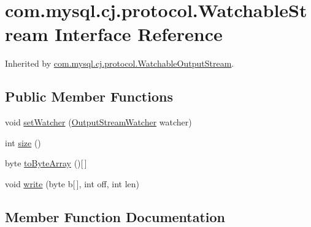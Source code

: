 \hypertarget{interfacecom_1_1mysql_1_1cj_1_1protocol_1_1_watchable_stream}{}\section{com.\+mysql.\+cj.\+protocol.\+Watchable\+Stream Interface Reference}
\label{interfacecom_1_1mysql_1_1cj_1_1protocol_1_1_watchable_stream}


Inherited by \mbox{\hyperlink{classcom_1_1mysql_1_1cj_1_1protocol_1_1_watchable_output_stream}{com.\+mysql.\+cj.\+protocol.\+Watchable\+Output\+Stream}}.

\subsection*{Public Member Functions}
\begin{DoxyCompactItemize}
\item 
void \mbox{\hyperlink{interfacecom_1_1mysql_1_1cj_1_1protocol_1_1_watchable_stream_aa3a3e9b08ec23693950ef766decd7205}{set\+Watcher}} (\mbox{\hyperlink{interfacecom_1_1mysql_1_1cj_1_1protocol_1_1_output_stream_watcher}{Output\+Stream\+Watcher}} watcher)
\item 
int \mbox{\hyperlink{interfacecom_1_1mysql_1_1cj_1_1protocol_1_1_watchable_stream_a12dc589ba91926b7bb5ee65e59c262c7}{size}} ()
\item 
byte \mbox{\hyperlink{interfacecom_1_1mysql_1_1cj_1_1protocol_1_1_watchable_stream_a1f74a409c152e12945e1448b45bcc110}{to\+Byte\+Array}} ()\mbox{[}$\,$\mbox{]}
\item 
void \mbox{\hyperlink{interfacecom_1_1mysql_1_1cj_1_1protocol_1_1_watchable_stream_a266c3021dfaf9c1d9d46ec2c63d83870}{write}} (byte b\mbox{[}$\,$\mbox{]}, int off, int len)
\end{DoxyCompactItemize}


\subsection{Member Function Documentation}
\mbox{\label{interfacecom_1_1mysql_1_1cj_1_1protocol_1_1_watchable_stream_aa3a3e9b08ec23693950ef766decd7205}} 
